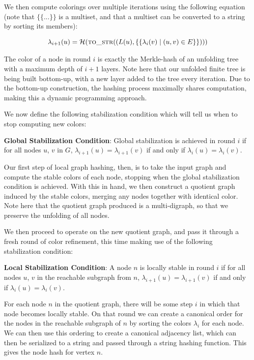 \documentclass[twoside,leqno]{article}
\begin{document}
We then compute colorings over multiple iterations using the following equation (note that $\{\{...\}\}$ is a multiset, and that a multiset can be converted to a string by sorting its members):

\begin{equation}
  \label{eq:coloring-step}
  \lambda_{i+1}(u) = \mathcal{H}(\textproc{to\_str}((L(u), \{\{\lambda_{i}(v) \mid (u, v) \in E\}\})))
\end{equation}

The color of a node in round $i$ is exactly the Merkle-hash of an unfolding tree with a maximum depth of $i+1$ layers. Note here that our unfolded finite tree is being built bottom-up, with a new layer added to the tree every iteration. Due to the bottom-up construction, the hashing process maximally shares computation, making this a dynamic programming approach.

We now define the following stabilization condition which will tell us when to stop computing new colors:

\begin{stoppingcondition}
\textbf{Global Stabilization Condition}: Global stabilization is achieved in round $i$ if for all nodes $u$, $v$ in $G$, $\lambda_{i+1}(u)=\lambda_{i+1}(v)$ if and only if $\lambda_i(u)=\lambda_i(v)$.
\end{stoppingcondition}

Our first step of local graph hashing, then, is to take the input graph and compute the stable colors of each node, stopping when the global stabilization condition is achieved. With this in hand, we then construct a quotient graph induced by the stable colors, merging any nodes together with identical color. Note here that the quotient graph produced is a multi-digraph, so that we preserve the unfolding of all nodes.

We then proceed to operate on the new quotient graph, and pass it through a fresh round of color refinement, this time making use of the following stabilization condition:

\begin{stoppingcondition}
\textbf{Local Stabilization Condition}: A node $n$ is locally stable in round $i$ if for all nodes $u$, $v$ in the reachable subgraph from $n$, $\lambda_{i+1}(u)=\lambda_{i+1}(v)$ if and only if $\lambda_i(u)=\lambda_i(v)$.
\end{stoppingcondition}

For each node $n$ in the quotient graph, there will be some step $i$ in which that node becomes locally stable. On that round we can create a canonical order for the nodes in the reachable subgraph of $n$ by sorting the colors $\lambda_i$ for each node. We can then use this ordering to create a canonical adjacency list, which can then be serialized to a string and passed through a string hashing function. This gives the node hash for vertex $n$.
\end{document}
